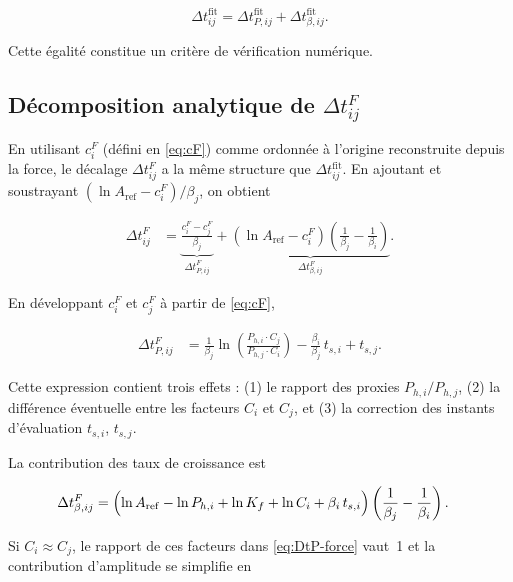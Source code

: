 \documentclass[11pt,a4paper]{article}
\newcommand{\betai}{\beta_i}                   %
\newcommand{\Pproxy}{P_{h,i}}                  %
\newcommand{\cFi}{c_i^{F}}                     %
\newcommand{\Aref}{A_{\mathrm{ref}}}           %
\newcommand{\Dtfit}{\Delta t_{ij}^{\mathrm{fit}}}
\newcommand{\DtF}{\Delta t_{ij}^{F}}
\newcommand{\DtPfit}{\Delta t_{P,ij}^{\mathrm{fit}}}
\newcommand{\DtPF}{\Delta t_{P,ij}^{F}}
\newcommand{\Dtbfit}{\Delta t_{\beta,ij}^{\mathrm{fit}}}
\newcommand{\DtbF}{\Delta t_{\beta,ij}^{F}}
\begin{document}
\begin{equation}
    \Dtfit = \DtPfit + \Dtbfit.
    \label{eq:decomp-check-fit}
\end{equation}

Cette égalité constitue un critère de vérification numérique.

\subsection{Décomposition analytique de \texorpdfstring{$\DtF$}{Delta t F}}
\label{subsec:decomp-force}

En utilisant \(\cFi\) (défini en \ref{eq:cF}) comme ordonnée à l'origine
reconstruite depuis la force, le décalage \(\DtF\) a la même structure
que \(\Dtfit\). En ajoutant et soustrayant \((\ln\Aref - \cFi)/\beta_j\),
on obtient

\begin{align}
    \DtF
    &=
    \underbrace{
        \frac{\cFi - c_j^{F}}{\beta_j}
    }_{\DtPF}
    +
    \underbrace{
        \left(\ln\Aref - \cFi\right)
        \left(\frac{1}{\beta_j} - \frac{1}{\betai}\right)
    }_{\DtbF}.
    \label{eq:DtF-decomp}
\end{align}

En développant \(\cFi\) et \(c_j^{F}\) à partir de \ref{eq:cF},

\begin{align}
    \DtPF
    &=
    \frac{1}{\beta_j}
    \ln\!\left(
        \frac{\Pproxy\cdot C_j}{P_{h,j}\cdot C_i}
    \right)
    -
    \frac{\betai}{\beta_j}\,t_{s,i}
    +
    t_{s,j}.
    \label{eq:DtP-force}
\end{align}

Cette expression contient trois effets : (1) le rapport des proxies
\(\Pproxy/P_{h,j}\), (2) la différence éventuelle entre les facteurs \(C_i\) et
\(C_j\), et (3) la correction des instants d'évaluation \(t_{s,i}\),
\(t_{s,j}\).

La contribution des taux de croissance est

\begin{align}
    \DtbF
    &=
    \Bigl(
        \ln\Aref
        - \ln\Pproxy
        + \ln K_f
        + \ln C_i
        + \betai\,t_{s,i}
    \Bigr)
    \left(\frac{1}{\beta_j} - \frac{1}{\betai}\right).
    \label{eq:Dtb-force}
\end{align}

Si \(C_i \approx C_j\), le rapport de ces facteurs dans \ref{eq:DtP-force}
vaut~1 et la contribution d'amplitude se simplifie en
\end{document}
